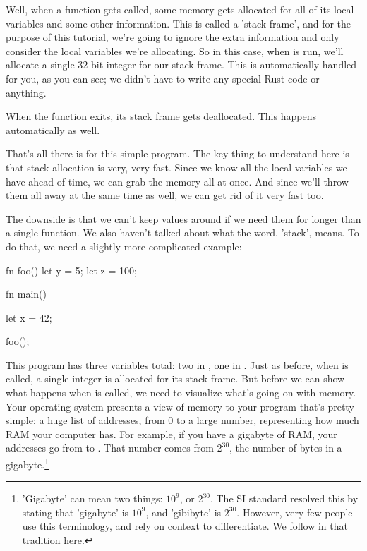\blank

Well, when a function gets called, some memory gets allocated for all of its local variables and some other information. This is called a 
'stack frame', and for the purpose of this tutorial, we're going to ignore the extra information and only consider the local variables 
we're allocating. So in this case, when  is run, we'll allocate a single 32-bit integer for our stack frame. This is 
automatically handled for you, as you can see; we didn't have to write any special Rust code or anything.

\blank

When the function exits, its stack frame gets deallocated. This happens automatically as well.

\blank

That's all there is for this simple program. The key thing to understand here is that stack allocation is very, very fast. Since we know 
all the local variables we have ahead of time, we can grab the memory all at once. And since we'll throw them all away at the same time as 
well, we can get rid of it very fast too.

\blank

The downside is that we can't keep values around if we need them for longer than a single function. We also haven't talked about what 
the word, 'stack', means. To do that, we need a slightly more complicated example:

\begin{rustc}
fn foo() {
    let y = 5;
    let z = 100;
}

fn main() {
    let x = 42;

    foo();
}
\end{rustc}

This program has three variables total: two in , one in . Just as before, when  is called, a single 
integer is allocated for its stack frame. But before we can show what happens when  is called, we need to visualize what's 
going on with memory. Your operating system presents a view of memory to your program that's pretty simple: a huge list of addresses, from 
0 to a large number, representing how much RAM your computer has. For example, if you have a gigabyte of RAM, your addresses go from  
to . That number comes from $2^{30}$, the number of bytes in a gigabyte.\footnote{'Gigabyte' can mean two things: 
$10^{9}$, or $2^{30}$. The SI standard resolved this by stating that 'gigabyte' is $10^{9}$, and 'gibibyte' is $2^{30}$. However, very 
few people use this terminology, and rely on context to differentiate. We follow in that tradition here.}

